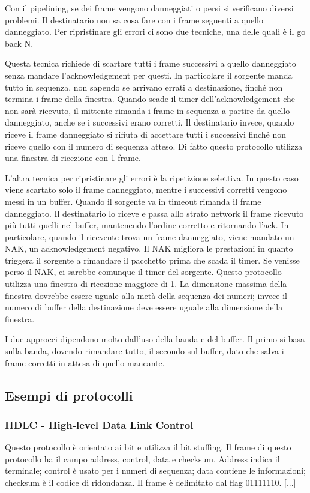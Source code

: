 Con il pipelining, se dei frame vengono danneggiati o persi si verificano diversi problemi.
Il destinatario non sa cosa fare con i frame seguenti a quello danneggiato.
Per ripristinare gli errori ci sono due tecniche, una delle quali è il go back N.

Questa tecnica richiede di scartare tutti i frame successivi a quello danneggiato senza mandare l'acknowledgement per questi.
In particolare il sorgente manda tutto in sequenza, non sapendo se arrivano errati a destinazione, finché non termina i frame della finestra.
Quando scade il timer dell'acknowledgement che non sarà ricevuto, il mittente rimanda i frame in sequenza a partire da quello danneggiato,
anche se i successivi erano corretti.
Il destinatario invece, quando riceve il frame danneggiato si rifiuta di accettare tutti i successivi finché non riceve quello con il numero di sequenza atteso.
Di fatto questo protocollo utilizza una finestra di ricezione con 1 frame.

L'altra tecnica per ripristinare gli errori è la ripetizione selettiva.
In questo caso viene scartato solo il frame danneggiato, mentre i successivi corretti vengono messi in un buffer.
Quando il sorgente va in timeout rimanda il frame danneggiato.
Il destinatario lo riceve e passa allo strato network il frame ricevuto più tutti quelli nel buffer, mantenendo l'ordine corretto e ritornando l'ack.
In particolare, quando il ricevente trova un frame danneggiato, viene mandato un NAK, un acknowledgement negativo.
Il NAK migliora le prestazioni in quanto triggera il sorgente a rimandare il pacchetto prima che scada il timer.
Se venisse perso il NAK, ci sarebbe comunque il timer del sorgente.
Questo protocollo utilizza una finestra di ricezione maggiore di 1.
La dimensione massima della finestra dovrebbe essere uguale alla metà della sequenza dei numeri;
invece il numero di buffer della destinazione deve essere uguale alla dimensione della finestra.

I due approcci dipendono molto dall'uso della banda e del buffer. 
Il primo si basa sulla banda, dovendo rimandare tutto, il secondo sul buffer, dato che salva i frame corretti in attesa di quello mancante.

\subsection{Esempi di protocolli} %

\subsubsection{HDLC - High-level Data Link Control}
Questo protocollo è orientato ai bit e utilizza il bit stuffing.
Il frame di questo protocollo ha il campo address, control, data e checksum.
Address indica il terminale; control è usato per i numeri di sequenza; 
data contiene le informazioni; checksum è il codice di ridondanza.
Il frame è delimitato dal flag 01111110.
[...]

